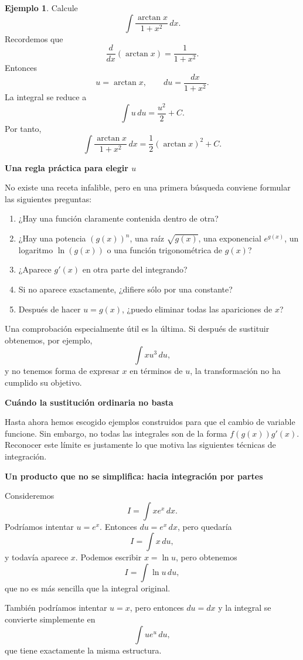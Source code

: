 \documentclass[12pt]{article}
\theoremstyle{definition}
\newtheorem{ejemplo}[teorema]{Ejemplo}
\theoremstyle{remark}
\begin{document}
\begin{ejemplo}
Calcule
\[
\int\frac{\arctan x}{1+x^2}\,dx.
\]
Recordemos que
\[
\frac{d}{dx}(\arctan x)=\frac1{1+x^2}.
\]
Entonces
\[
u=\arctan x,\qquad du=\frac{dx}{1+x^2}.
\]
La integral se reduce a
\[
\int u\,du=\frac{u^2}{2}+C.
\]
Por tanto,
\[
\boxed{\int\frac{\arctan x}{1+x^2}\,dx=\frac12(\arctan x)^2+C.}
\]
\end{ejemplo}

\textbf{Una regla práctica para elegir $u$}

No existe una receta infalible, pero en una primera búsqueda conviene formular las siguientes preguntas:
\begin{enumerate}
\item ¿Hay una función claramente contenida dentro de otra?
\item ¿Hay una potencia $(g(x))^n$, una raíz $\sqrt{g(x)}$, una exponencial $e^{g(x)}$, un logaritmo $\ln(g(x))$ o una función trigonométrica de $g(x)$?
\item ¿Aparece $g'(x)$ en otra parte del integrando?
\item Si no aparece exactamente, ¿difiere sólo por una constante?
\item Después de hacer $u=g(x)$, ¿puedo eliminar todas las apariciones de $x$?
\end{enumerate}

Una comprobación especialmente útil es la última. Si después de sustituir obtenemos, por ejemplo,
\[
\int xu^3\,du,
\]
y no tenemos forma de expresar $x$ en términos de $u$, la transformación no ha cumplido su objetivo.

\textbf{Cuándo la sustitución ordinaria no basta}

Hasta ahora hemos escogido ejemplos construidos para que el cambio de variable funcione. Sin embargo, no todas las integrales son de la forma $f(g(x))g'(x)$. Reconocer este límite es justamente lo que motiva las siguientes técnicas de integración.

\textbf{Un producto que no se simplifica: hacia integración por partes}

Consideremos
\[
I=\int xe^x\,dx.
\]
Podríamos intentar $u=e^x$. Entonces $du=e^x\,dx$, pero quedaría
\[
I=\int x\,du,
\]
y todavía aparece $x$. Podemos escribir $x=\ln u$, pero obtenemos
\[
I=\int\ln u\,du,
\]
que no es más sencilla que la integral original.

También podríamos intentar $u=x$, pero entonces $du=dx$ y la integral se convierte simplemente en
\[
\int ue^u\,du,
\]
que tiene exactamente la misma estructura.
\end{document}
